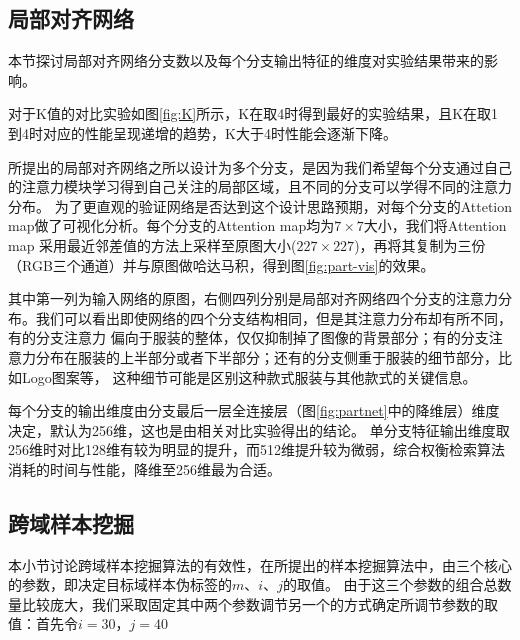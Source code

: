 \subsection{局部对齐网络}
本节探讨局部对齐网络分支数以及每个分支输出特征的维度对实验结果带来的影响。

对于K值的对比实验如图\ref{fig:K}所示，K在取4时得到最好的实验结果，且K在取1到4时对应的性能呈现递增的趋势，K大于4时性能会逐渐下降。

所提出的局部对齐网络之所以设计为多个分支，是因为我们希望每个分支通过自己的注意力模块学习得到自己关注的局部区域，且不同的分支可以学得不同的注意力分布。
为了更直观的验证网络是否达到这个设计思路预期，对每个分支的Attetion map做了可视化分析。每个分支的Attention map均为$7 \times 7$大小，我们将Attention map
采用最近邻差值的方法上采样至原图大小($227 \times 227$)，再将其复制为三份（RGB三个通道）并与原图做哈达马积，得到图\ref{fig:part-vis}的效果。

其中第一列为输入网络的原图，右侧四列分别是局部对齐网络四个分支的注意力分布。我们可以看出即使网络的四个分支结构相同，但是其注意力分布却有所不同，有的分支注意力
偏向于服装的整体，仅仅抑制掉了图像的背景部分；有的分支注意力分布在服装的上半部分或者下半部分；还有的分支侧重于服装的细节部分，比如Logo图案等，
这种细节可能是区别这种款式服装与其他款式的关键信息。


每个分支的输出维度由分支最后一层全连接层（图\ref{fig:partnet}中的降维层）维度决定，默认为256维，这也是由相关对比实验得出的结论。
单分支特征输出维度取256维时对比128维有较为明显的提升，而512维提升较为微弱，综合权衡检索算法消耗的时间与性能，降维至256维最为合适。
\subsection{跨域样本挖掘}
本小节讨论跨域样本挖掘算法的有效性，在所提出的样本挖掘算法中，由三个核心的参数，即决定目标域样本伪标签的$m、i、j$的取值。
由于这三个参数的组合总数量比较庞大，我们采取固定其中两个参数调节另一个的方式确定所调节参数的取值：首先令$i=30$，$j=40$

